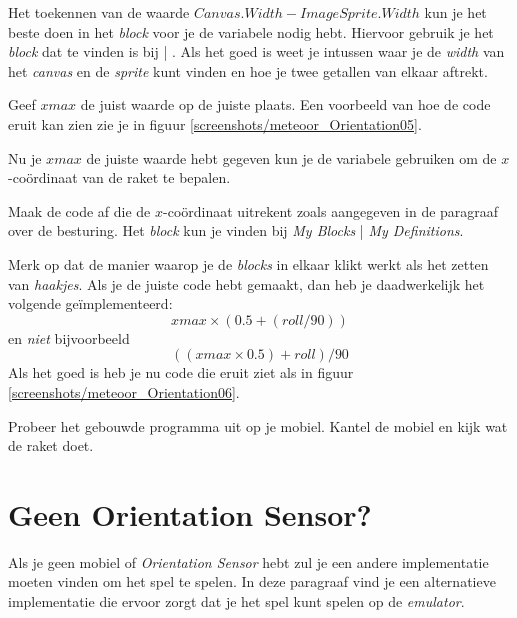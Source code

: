 Het toekennen van de waarde $Canvas.Width - ImageSprite.Width$ kun je het beste doen in het  \emph{block} voor je de variabele nodig hebt. Hiervoor gebruik je het  \emph{block} dat te vinden is bij  | . Als het goed is weet je intussen waar je de \emph{width} van het \emph{canvas} en de \emph{sprite} kunt vinden en hoe je twee getallen van elkaar aftrekt.

\begin{opgave}
    \opgVraag
  Geef $xmax$ de juist waarde op de juiste plaats. Een voorbeeld van hoe de code eruit kan zien zie je in figuur \ref{screenshots/meteoor_Orientation05}.
\end{opgave}


Nu je $xmax$ de juiste waarde hebt gegeven kun je de variabele gebruiken om de $x$-co\"ordinaat van de raket te bepalen.

\begin{opgave}
    \opgVraag
  Maak de code af die de $x$-co\"ordinaat uitrekent zoals aangegeven in de paragraaf over de besturing. Het  \emph{block} kun je vinden bij \emph{My Blocks} | \emph{My Definitions}.
\end{opgave}

Merk op dat de manier waarop je de \emph{blocks} in elkaar klikt werkt als het zetten van \emph{haakjes}. Als je de juiste code hebt gemaakt, dan heb je daadwerkelijk het volgende ge\"implementeerd:
\[
	xmax \times (0.5 + (roll/90))
\]
en \emph{niet} bijvoorbeeld
\[
	((xmax \times 0.5) + roll)/90  
\]
Als het goed is heb je nu code die eruit ziet als in figuur \ref{screenshots/meteoor_Orientation06}.


\runOpTelefoon{}
Probeer het gebouwde programma uit op je mobiel. Kantel de mobiel en kijk wat de raket doet. 


\section{Geen Orientation Sensor?}
Als je geen mobiel of \emph{Orientation Sensor} hebt zul je een andere implementatie moeten vinden om het spel te spelen. In deze paragraaf vind je een alternatieve implementatie die ervoor zorgt dat je het spel kunt spelen op de \emph{emulator}.

